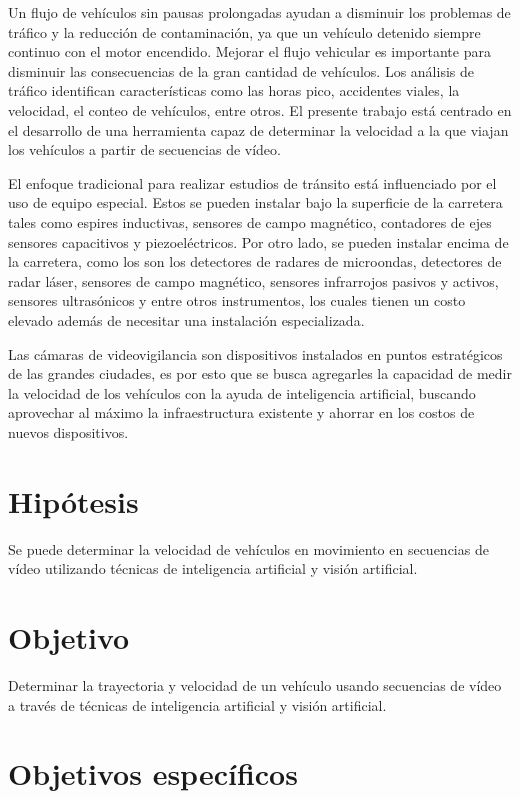 Un flujo de vehículos sin pausas prolongadas ayudan a disminuir los problemas de tráfico y la reducción de contaminación, ya que un vehículo detenido siempre continuo con el motor encendido. Mejorar el flujo vehicular es importante para disminuir las consecuencias de la gran cantidad de vehículos. Los análisis de tráfico identifican características como las horas pico, accidentes viales, la velocidad, el conteo de vehículos, entre otros. El presente trabajo está centrado en el desarrollo de una herramienta capaz de determinar la velocidad a la que viajan los vehículos a partir de secuencias de vídeo.

El enfoque tradicional para realizar estudios de tránsito está influenciado por el uso de equipo especial. Estos se pueden instalar bajo la superficie de la carretera tales como espires inductivas, sensores de campo magnético, contadores de ejes sensores capacitivos y piezoeléctricos. Por otro lado, se pueden instalar encima de la carretera, como los son los detectores de radares de microondas, detectores de radar láser, sensores de campo magnético, sensores infrarrojos pasivos y activos, sensores ultrasónicos y entre otros instrumentos, los cuales tienen un costo elevado además de necesitar una instalación especializada.

Las cámaras de videovigilancia son dispositivos instalados en puntos estratégicos de las grandes ciudades, es por esto que se busca agregarles la capacidad de medir la velocidad de los vehículos con la ayuda de inteligencia artificial, buscando aprovechar al máximo la infraestructura existente y ahorrar en los costos de nuevos dispositivos.

\section{Hipótesis}

Se puede determinar la velocidad de vehículos en movimiento en secuencias de vídeo utilizando técnicas de inteligencia artificial y visión artificial.

\section{Objetivo}

Determinar la trayectoria y velocidad de un vehículo usando secuencias de vídeo a través de técnicas de inteligencia artificial y visión artificial.

\section{Objetivos específicos}

